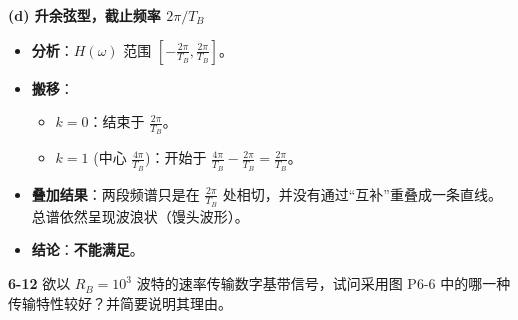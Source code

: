 \documentclass[a4paper,11pt]{ctexart}
\begin{document}
    \textbf{(d) 升余弦型，截止频率 $2\pi/T_B$}
    \begin{itemize}
        \item \textbf{分析}：$H(\omega)$ 范围 $[-\frac{2\pi}{T_B}, \frac{2\pi}{T_B}]$。
        \item \textbf{搬移}：
            \begin{itemize}
                \item $k=0$：结束于 $\frac{2\pi}{T_B}$。
                \item $k=1$ (中心 $\frac{4\pi}{T_B}$)：开始于 $\frac{4\pi}{T_B} - \frac{2\pi}{T_B} = \frac{2\pi}{T_B}$。
            \end{itemize}
        \item \textbf{叠加结果}：两段频谱只是在 $\frac{2\pi}{T_B}$ 处相切，并没有通过“互补”重叠成一条直线。总谱依然呈现波浪状（馒头波形）。
        \item \textbf{结论}：\textbf{不能满足}。
    \end{itemize}

\vspace{1em}

\noindent \textbf{6-12} 欲以 $R_B = 10^3$ 波特的速率传输数字基带信号，试问采用图 P6-6 中的哪一种传输特性较好？并简要说明其理由。
\end{document}
